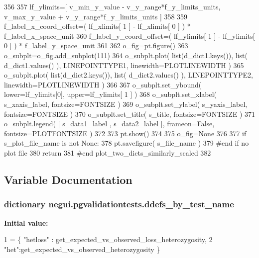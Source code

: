 \begin{DoxyCode}
356 
357     lf\_ylimits=[ v\_min\_y\_value - v\_y\_range*f\_y\_limits\_units, v\_max\_y\_value + v\_y\_range*f\_y\_limits\_units ]
358 
359     f\_label\_x\_coord\_offset=( lf\_xlimits[ 1 ] - lf\_xlimits[ 0 ] ) * f\_label\_x\_space\_unit
360     f\_label\_y\_coord\_offset=( lf\_ylimits[ 1 ] - lf\_ylimits[ 0 ] ) * f\_label\_y\_space\_unit
361                 
362     o\_fig=pt.figure()
363     o\_subplt=o\_fig.add\_subplot(111)
364     o\_subplt.plot( list(d\_dict1.keys()), list( d\_dict1.values() ), LINEPOINTTYPE1, linewidth=PLOTLINEWIDTH 
      )
365     o\_subplt.plot( list(d\_dict2.keys()), list( d\_dict2.values() ), LINEPOINTTYPE2, linewidth=PLOTLINEWIDTH 
      )
366 
367     o\_subplt.set\_ybound( lower=lf\_ylimits[0], upper=lf\_ylimits[ 1 ] )
368     o\_subplt.set\_xlabel( s\_xaxis\_label, fontsize=FONTSIZE )
369     o\_subplt.set\_ylabel( s\_yaxis\_label, fontsize=FONTSIZE )
370     o\_subplt.set\_title( s\_title, fontsize=FONTSIZE )
371     o\_subplt.legend( [ s\_data1\_label , s\_data2\_label ], frameon=\textcolor{keyword}{False}, fontsize=PLOTFONTSIZE )
372 
373     pt.show()
374 
375     o\_fig=\textcolor{keywordtype}{None}
376 
377     \textcolor{keywordflow}{if} s\_plot\_file\_name \textcolor{keywordflow}{is} \textcolor{keywordflow}{not} \textcolor{keywordtype}{None}:
378         pt.savefigure( s\_file\_name )
379     \textcolor{comment}{#end if no plot file}
380     \textcolor{keywordflow}{return}
381 \textcolor{comment}{#end plot\_two\_dicts\_similarly\_scaled}
382 
\end{DoxyCode}


\subsection{Variable Documentation}
\subsubsection[{\texorpdfstring{ddefs\+\_\+by\+\_\+test\+\_\+name}{ddefs_by_test_name}}]{\setlength{\rightskip}{0pt plus 5cm}dictionary negui.\+pgvalidationtests.\+ddefs\+\_\+by\+\_\+test\+\_\+name}\hypertarget{namespacenegui_1_1pgvalidationtests_ae3331aa28e38492caa2fdc9b420889a7}{}\label{namespacenegui_1_1pgvalidationtests_ae3331aa28e38492caa2fdc9b420889a7}
{\bfseries Initial value\+:}
\begin{DoxyCode}
1 = \{ \textcolor{stringliteral}{"hetloss"} : get\_expected\_vs\_observed\_loss\_heterozygosity, 
2                                     \textcolor{stringliteral}{"het"}:get\_expected\_vs\_observed\_heterozygosity \}
\end{DoxyCode}


